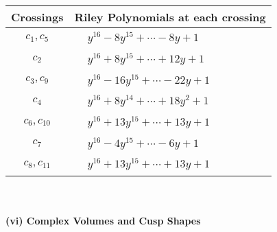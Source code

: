 \documentclass[1p]{elsarticle_modified}
\theoremstyle{definition}
\begin{document}
\begin{tabular}{m{50pt}|m{274pt}}
Crossings & \hspace{64pt}Riley Polynomials at each crossing \\
\hline $$\begin{aligned}c_{1},c_{5}\end{aligned}$$&$\begin{aligned}
&y^{16}-8 y^{15}+\cdots-8 y+1
\end{aligned}$\\
\hline $$\begin{aligned}c_{2}\end{aligned}$$&$\begin{aligned}
&y^{16}+8 y^{15}+\cdots+12 y+1
\end{aligned}$\\
\hline $$\begin{aligned}c_{3},c_{9}\end{aligned}$$&$\begin{aligned}
&y^{16}-16 y^{15}+\cdots-22 y+1
\end{aligned}$\\
\hline $$\begin{aligned}c_{4}\end{aligned}$$&$\begin{aligned}
&y^{16}+8 y^{14}+\cdots+18 y^2+1
\end{aligned}$\\
\hline $$\begin{aligned}c_{6},c_{10}\end{aligned}$$&$\begin{aligned}
&y^{16}+13 y^{15}+\cdots+13 y+1
\end{aligned}$\\
\hline $$\begin{aligned}c_{7}\end{aligned}$$&$\begin{aligned}
&y^{16}-4 y^{15}+\cdots-6 y+1
\end{aligned}$\\
\hline $$\begin{aligned}c_{8},c_{11}\end{aligned}$$&$\begin{aligned}
&y^{16}+13 y^{15}+\cdots+13 y+1
\end{aligned}$\\
\hline
\end{tabular}\\~\\
\newpage\flushleft \textbf{(vi) Complex Volumes and Cusp Shapes}
\end{document}
